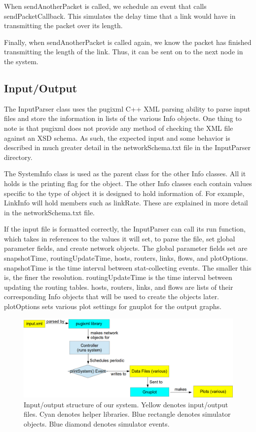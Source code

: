 When sendAnotherPacket is called, we schedule an event that calls sendPacketCallback. This simulates the delay time that a link would have in transmitting the packet over its length. 

Finally, when sendAnotherPacket is called again, we know the packet has finished transmitting the length of the link. Thus, it can be sent on to the next node in the system.  

\subsection{Input/Output}
    The InputParser class uses the pugixml C++ XML parsing ability to parse input files and store the information in lists of the various Info objects. One thing to note is that pugixml does not provide any method of checking the XML file against an XSD schema. As such, the expected input and some behavior is described in much greater detail in the networkSchema.txt file in the InputParser directory.
    
    The SystemInfo class is used as the parent class for the other Info classes. All it holds is the printing flag for the object. The other Info classes each contain values specific to the type of object it is designed to hold information of. For example, LinkInfo will hold members such as linkRate. These are explained in more detail in the networkSchema.txt file.
    
    If the input file is formatted correctly, the InputParser can call its run function, which takes in references to the values it will set, to parse the file, set global parameter fields, and create network objects. The global parameter fields set are snapshotTime, routingUpdateTime, hosts, routers, links, flows, and plotOptions. snapshotTime is the time interval between stat-collecting events. The smaller this is, the finer the resolution. routingUpdateTime is the time interval between updating the routing tables. hosts, routers, links, and flows are lists of their corresponding Info objects that will be used to create the objects later. plotOptions sets various plot settings for gnuplot for the output graphs.
           
\begin{figure}[htbp]
    \centering
    \includegraphics[width=\textwidth]{io.png}
    \caption{Input/output structure of our system. Yellow denotes input/output files. Cyan denotes helper libraries. Blue rectangle denotes simulator objects. Blue diamond denotes simulator events. }
\end{figure}

